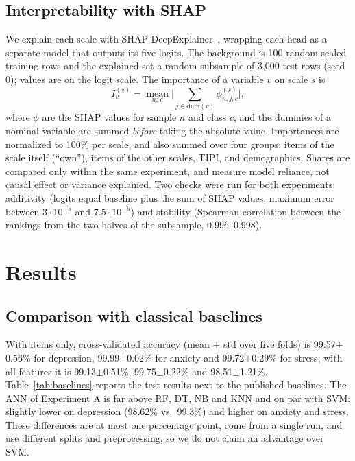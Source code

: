 \documentclass[conference,compsoc]{IEEEtran}
\begin{document}
\subsection{Interpretability with SHAP}
We explain each scale with SHAP DeepExplainer~\cite{shap}, wrapping each head as a separate model that outputs its five logits.
The background is 100 random scaled training rows and the explained set a random subsample of 3,000 test rows (seed 0); values are on the logit scale.
The importance of a variable $v$ on scale $s$ is
\begin{equation}
I_v^{(s)}=\operatorname*{mean}_{n,\,c}\Big|\sum_{j\in \mathrm{dum}(v)}\phi^{(s)}_{n,j,c}\Big|,
\end{equation}
where $\phi$ are the SHAP values for sample $n$ and class $c$, and the dummies of a nominal variable are summed \emph{before} taking the absolute value.
Importances are normalized to 100\% per scale, and also summed over four groups: items of the scale itself (``own''), items of the other scales, TIPI, and demographics.
Shares are compared only within the same experiment, and measure model reliance, not causal effect or variance explained.
Two checks were run for both experiments: additivity (logits equal baseline plus the sum of SHAP values, maximum error between $3\cdot10^{-5}$ and $7.5\cdot10^{-5}$) and stability (Spearman correlation between the rankings from the two halves of the subsample, 0.996--0.998).

\section{Results}
\subsection{Comparison with classical baselines}
With items only, cross-validated accuracy (mean $\pm$ std over five folds) is 99.57$\pm$0.56\% for depression, 99.99$\pm$0.02\% for anxiety and 99.72$\pm$0.29\% for stress; with all features it is 99.13$\pm$0.51\%, 99.75$\pm$0.22\% and 98.51$\pm$1.21\%.
Table~\ref{tab:baselines} reports the test results next to the published baselines.
The ANN of Experiment A is far above RF, DT, NB and KNN and on par with SVM: slightly lower on depression (98.62\% vs.\ 99.3\%) and higher on anxiety and stress.
These differences are at most one percentage point, come from a single run, and use different splits and preprocessing, so we do not claim an advantage over SVM.
\end{document}

